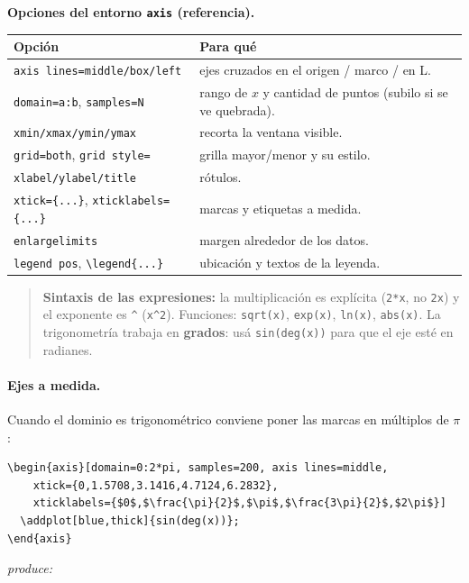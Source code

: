 \documentclass[11pt,a4paper]{article}
\newcommand{\C}[1]{\texttt{\textbackslash #1}}
\newcommand{\produce}{\par\smallskip\noindent\textit{produce:}\par\smallskip}
\begin{document}
\noindent\textbf{Opciones del entorno \texttt{axis} (referencia).}
\begin{center}\small
\renewcommand{\arraystretch}{1.25}
\begin{tabularx}{\linewidth}{@{}l X@{}}
\toprule
\textbf{Opción} & \textbf{Para qué} \\
\midrule
\texttt{axis lines=middle/box/left} & ejes cruzados en el origen / marco / en L. \\
\texttt{domain=a:b}, \texttt{samples=N} & rango de $x$ y cantidad de puntos (subilo si se ve quebrada). \\
\texttt{xmin/xmax/ymin/ymax} & recorta la ventana visible. \\
\texttt{grid=both}, \texttt{grid style=} & grilla mayor/menor y su estilo. \\
\texttt{xlabel/ylabel/title} & rótulos. \\
\texttt{xtick=\{...\}}, \texttt{xticklabels=\{...\}} & marcas y etiquetas a medida. \\
\texttt{enlargelimits} & margen alrededor de los datos. \\
\texttt{legend pos}, \C{legend\{...\}} & ubicación y textos de la leyenda. \\
\bottomrule
\end{tabularx}
\end{center}
\begin{quote}\small
\textbf{Sintaxis de las expresiones:} la multiplicación es explícita (\texttt{2*x},
no \texttt{2x}) y el exponente es \texttt{\^{}} (\texttt{x\^{}2}). Funciones:
\texttt{sqrt(x)}, \texttt{exp(x)}, \texttt{ln(x)}, \texttt{abs(x)}. La
trigonometría trabaja en \textbf{grados}: usá \texttt{sin(deg(x))} para que el eje
esté en radianes.
\end{quote}

\paragraph{Ejes a medida.} Cuando el dominio es trigonométrico conviene poner las
marcas en múltiplos de $\pi$:
\begin{lstlisting}
\begin{axis}[domain=0:2*pi, samples=200, axis lines=middle,
    xtick={0,1.5708,3.1416,4.7124,6.2832},
    xticklabels={$0$,$\frac{\pi}{2}$,$\pi$,$\frac{3\pi}{2}$,$2\pi$}]
  \addplot[blue,thick]{sin(deg(x))};
\end{axis}
\end{lstlisting}
\produce
\begin{center}
\end{center}
\end{document}
